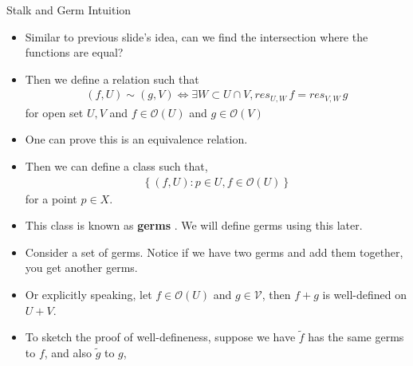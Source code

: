 \documentclass[10pt,aspectratio=1610]{beamer}
\theoremstyle{definition}
\begin{document}
    \begin{frame}{Stalk and Germ Intuition}
        \begin{itemize}
            \item Similar to previous slide's idea, can we find the intersection where the functions are equal?
            \item Then we define a relation such that 
            \begin{align*}
                (f, U)\sim(g, V) \iff \exists W \subset U \cap V, res_{U, W} \, f = res_{V, W} \, g
            \end{align*}
            for open set $U, V$ and $f \in \mathcal{O}(U)$ and $g \in \mathcal{O}(V)$
            \item One can prove this is an equivalence relation.
            \item Then we can define a class such that, 
            \begin{align*}
                \left\{(f, U): p \in U, f \in \mathcal{O}(U)\right\}
            \end{align*}
            for a point $p \in X$. 
            \item This class is known as \textbf{germs} . We will define germs using this later. 
        \end{itemize}
        
    \end{frame}

    \begin{frame}
        \begin{itemize}
            \item Consider a set of germs. Notice if we have two germs and add them together, you get another germs.
            \item Or explicitly speaking, let $f\in \mathcal{O}(U)$ and $g\in\mathcal{V}$, then $f+g$ is well-defined on $U+V$.
            \item To sketch the proof of well-defineness, suppose we have $\widetilde{f}$ has the same germs to $f$, and also $\widetilde{g}$ to $g$, 
        \end{itemize}
        
    \end{frame}
\end{document}
